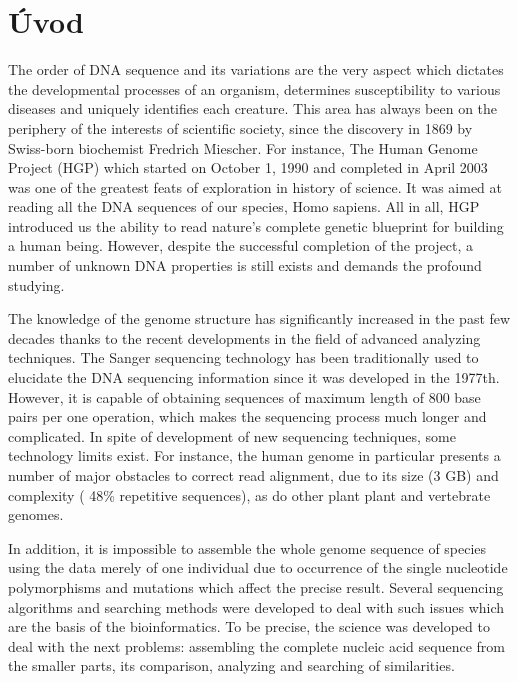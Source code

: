 
{}

\chapter*{Úvod}

\par The order of DNA sequence and its variations are the very aspect which dictates the developmental processes of an organism, determines susceptibility to various diseases and uniquely identifies each creature. This area has always been on the periphery of the interests of scientific society, since the discovery in 1869 by Swiss-born biochemist Fredrich Miescher. For instance, The Human Genome Project (HGP) which started on October 1, 1990 and completed in April 2003 was one of the greatest feats of exploration in history of science. It was aimed at reading all the DNA sequences of our species, Homo sapiens. All in all, HGP introduced us the ability to read nature's complete genetic blueprint for building a human being. However, despite the successful completion of the project, a number of unknown DNA properties is still exists and demands the profound studying.

The knowledge of the genome structure has significantly increased in the past few decades thanks to the recent developments in the field of advanced analyzing techniques. The Sanger sequencing technology has been traditionally used to elucidate the DNA sequencing information since it was developed in the 1977th. However, it is capable of obtaining sequences of maximum length of 800 base pairs per one operation, which makes the sequencing process much longer and complicated. In spite of development of new sequencing techniques, some technology limits exist. For instance, the human genome in particular presents a number of major obstacles to correct read alignment, due to its size (3 GB) and complexity ( 48\% repetitive sequences), as do other plant plant and vertebrate genomes.

In addition, it is impossible to assemble the whole genome sequence of species using the data merely of one individual due to occurrence of the single nucleotide polymorphisms and mutations which affect the precise result. Several sequencing algorithms and searching methods were developed to deal with such issues which are the basis of the bioinformatics. To be precise, the science was developed to deal with the next problems: assembling the complete nucleic acid sequence from the smaller parts, its comparison, analyzing and searching of similarities.

